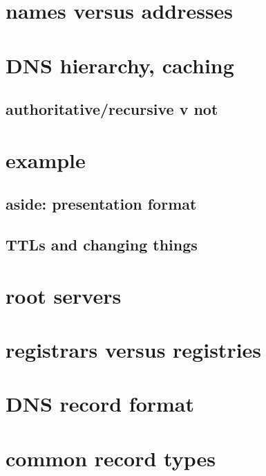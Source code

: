 
\section{names versus addresses}


\section{DNS hierarchy, caching}




\subsection{authoritative/recursive v not}


\section{example}


\subsection{aside: presentation format}


\subsection{TTLs and changing things}



\section{root servers}


\section{registrars versus registries}


\section{DNS record format}


\section{common record types}


